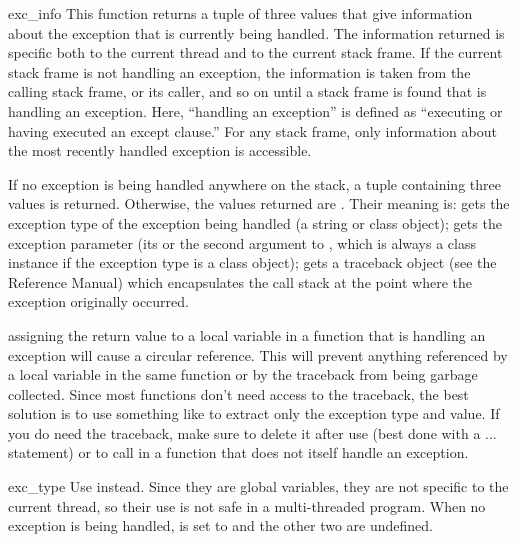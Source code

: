 \begin{funcdesc}{exc_info}{}
This function returns a tuple of three values that give information
about the exception that is currently being handled.  The information
returned is specific both to the current thread and to the current
stack frame.  If the current stack frame is not handling an exception,
the information is taken from the calling stack frame, or its caller,
and so on until a stack frame is found that is handling an exception.
Here, ``handling an exception'' is defined as ``executing or having
executed an except clause.''  For any stack frame, only
information about the most recently handled exception is accessible.

If no exception is being handled anywhere on the stack, a tuple
containing three  values is returned.  Otherwise, the
values returned are
.
Their meaning is:  gets the exception type of the exception
being handled (a string or class object);  gets the
exception parameter (its  or the second argument
to , which is always a class instance if the exception
type is a class object);  gets a traceback object (see
the Reference Manual) which encapsulates the call stack at the point
where the exception originally occurred.

 assigning the  return value to a
local variable in a function that is handling an exception will cause
a circular reference. This will prevent anything referenced by a local
variable in the same function or by the traceback from being garbage
collected.  Since most functions don't need access to the traceback,
the best solution is to use something like
to extract only the exception type and value.  If you do need the
traceback, make sure to delete it after use (best done with a
 ...  statement) or to call
 in a function that does not itself handle an
exception.
\end{funcdesc}

\begin{datadesc}{exc_type}
            {Use  instead.}
Since they are global variables, they are not specific to the current
thread, so their use is not safe in a multi-threaded program.  When no
exception is being handled,  is set to  and
the other two are undefined.
\end{datadesc}

